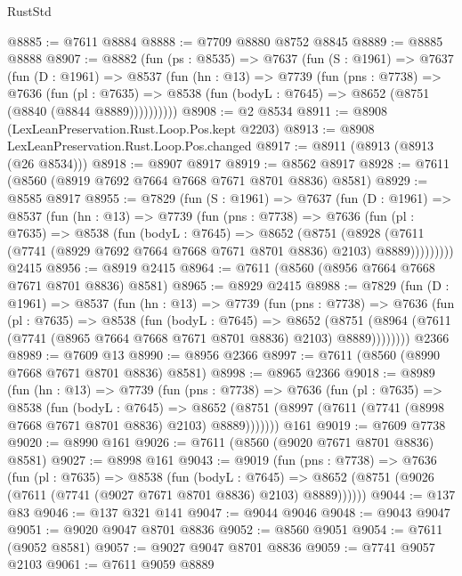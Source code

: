 \begin{lexlean}{RustStd}
\begin{coremodule}
{\begin{coremodule}
{{{{{{{{{{{{{{{{{{{{{{{{{{{{{{{{{{@8885 := @7611 @8884
@8888 := @7709 @8880 @8752 @8845
@8889 := @8885 @8888
@8907 := @8882
    (fun (ps : @8535) =>
    @7637
      (fun (S : @1961) =>
      @7637
        (fun (D : @1961) =>
        @8537
          (fun (hn : @13) =>
          @7739
            (fun (pns : @7738) =>
            @7636
              (fun (pl : @7635) =>
              @8538 (fun (bodyL : @7645) => @8652 (@8751 (@8840 (@8844 @8889))))))))))
@8908 := @2 @8534
@8911 := @8908 (LexLeanPreservation.Rust.Loop.Pos.kept @2203)
@8913 := @8908 LexLeanPreservation.Rust.Loop.Pos.changed
@8917 := @8911 (@8913 (@8913 (@26 @8534)))
@8918 := @8907 @8917
@8919 := @8562 @8917
@8928 := @7611 (@8560 (@8919 @7692 @7664 @7668 @7671 @8701 @8836) @8581)
@8929 := @8585 @8917
@8955 := @7829
    (fun (S : @1961) =>
    @7637
      (fun (D : @1961) =>
      @8537
        (fun (hn : @13) =>
        @7739
          (fun (pns : @7738) =>
          @7636
            (fun (pl : @7635) =>
            @8538
              (fun (bodyL : @7645) =>
              @8652
                (@8751
                  (@8928
                    (@7611 (@7741 (@8929 @7692 @7664 @7668 @7671 @8701 @8836) @2103) @8889)))))))))
    @2415
@8956 := @8919 @2415
@8964 := @7611 (@8560 (@8956 @7664 @7668 @7671 @8701 @8836) @8581)
@8965 := @8929 @2415
@8988 := @7829
    (fun (D : @1961) =>
    @8537
      (fun (hn : @13) =>
      @7739
        (fun (pns : @7738) =>
        @7636
          (fun (pl : @7635) =>
          @8538
            (fun (bodyL : @7645) =>
            @8652
              (@8751 (@8964 (@7611 (@7741 (@8965 @7664 @7668 @7671 @8701 @8836) @2103) @8889))))))))
    @2366
@8989 := @7609 @13
@8990 := @8956 @2366
@8997 := @7611 (@8560 (@8990 @7668 @7671 @8701 @8836) @8581)
@8998 := @8965 @2366
@9018 := @8989
    (fun (hn : @13) =>
    @7739
      (fun (pns : @7738) =>
      @7636
        (fun (pl : @7635) =>
        @8538
          (fun (bodyL : @7645) =>
          @8652 (@8751 (@8997 (@7611 (@7741 (@8998 @7668 @7671 @8701 @8836) @2103) @8889)))))))
    @161
@9019 := @7609 @7738
@9020 := @8990 @161
@9026 := @7611 (@8560 (@9020 @7671 @8701 @8836) @8581)
@9027 := @8998 @161
@9043 := @9019
    (fun (pns : @7738) =>
    @7636
      (fun (pl : @7635) =>
      @8538
        (fun (bodyL : @7645) =>
        @8652 (@8751 (@9026 (@7611 (@7741 (@9027 @7671 @8701 @8836) @2103) @8889))))))
@9044 := @137 @83
@9046 := @137 @321 @141
@9047 := @9044 @9046
@9048 := @9043 @9047
@9051 := @9020 @9047 @8701 @8836
@9052 := @8560 @9051
@9054 := @7611 (@9052 @8581)
@9057 := @9027 @9047 @8701 @8836
@9059 := @7741 @9057 @2103
@9061 := @7611 @9059 @8889
}}}}}}}}}}}}}}}}}}}}}}}}}}}}}}}}}}
\end{coremodule}}
\end{coremodule}
\end{lexlean}
